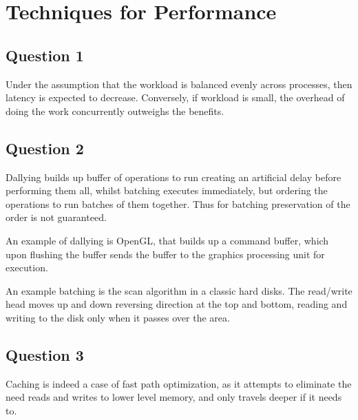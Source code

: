 
\section{Techniques for Performance}

\subsection{Question 1}

Under the assumption that the workload is balanced evenly across processes, then latency is expected to decrease. Conversely, if workload is small, the overhead of doing the work concurrently outweighs the benefits.

\subsection{Question 2}

Dallying builds up buffer of operations to run creating an artificial delay before performing them all, whilst batching executes immediately, but ordering the operations to run batches of them together. Thus for batching preservation of the order is not guaranteed.

An example of dallying is OpenGL, that builds up a command buffer, which upon flushing the buffer sends the buffer to the graphics processing unit for execution.

An example batching is the scan algorithm in a classic hard disks. The read/write head moves up and down reversing direction at the top and bottom, reading and writing to the disk only when it passes over the area.

\subsection{Question 3}

Caching is indeed a case of fast path optimization, as it attempts to eliminate the need reads and writes to lower level memory, and only travels deeper if it needs to.


